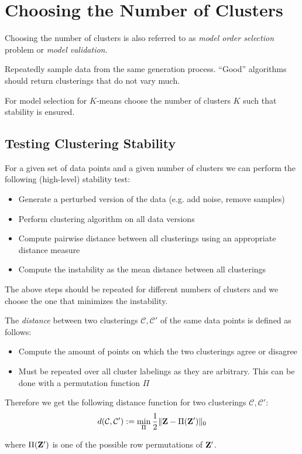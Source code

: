 \section{Choosing the Number of Clusters}
Choosing the number of clusters is also referred to as \textit{model order selection} problem or \textit{model validation}.

\begin{definition}
Repeatedly sample data from the same generation process. ``Good'' algorithms should return clusterings that do not vary much.
\end{definition}

For model selection for \(K\)-means choose the number of clusters \(K\) such that stability is ensured.

\subsection{Testing Clustering Stability}
For a given set of data points and a given number of clusters we can perform the following (high-level) stability test:
\begin{itemize}
\item Generate a perturbed version of the data (e.g. add noise, remove samples)
\item Perform clustering algorithm on all data versions
\item Compute pairwise distance between all clusterings using an appropriate distance measure
\item Compute the instability as the mean distance between all clusterings
\end{itemize}

The above steps should be repeated for different numbers of clusters and we choose the one that minimizes the instability.

The \textit{distance} between two clusterings \(\mathcal{C}, \mathcal{C}'\) of the same data points is defined as follows:
\begin{itemize}
\item Compute the amount of points on which the two clusterings agree or disagree
\item Must be repeated over all cluster labelings as they are arbitrary. This can be done with a permutation function \(\Pi\) 
\end{itemize}

\begin{definition}
Therefore we get the following distance function for two clusterings \(\mathcal{C}, \mathcal{C}'\): \[
d(\mathcal{C}, \mathcal{C}') := \min_{\Pi} \frac{1}{2} \| \mathbf{Z} - \Pi(\mathbf{Z}') \|_0
\]

where \(\Pi(\mathbf{Z}')\) is one of the possible row permutations of \(\mathbf{Z}'\).
\end{definition}

